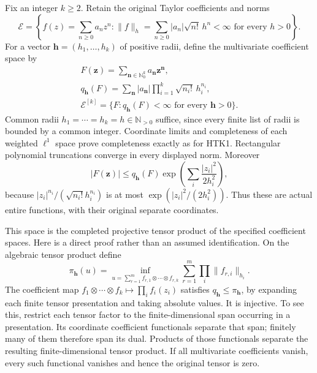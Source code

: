 Fix an integer $k\ge2$. Retain the original Taylor coefficients
and norms
\begin{equation}\tag{HTK1}
 \mathcal E=\left\{f(z)=\sum_{n\ge0}a_nz^n:
  \|f\|_h=\sum_{n\ge0}|a_n|\sqrt{n!}\,h^n<\infty
                 \text{ for every }h>0\right\}.
\end{equation}
For a vector $\mathbf h=(h_1,\ldots,h_k)$ of positive radii,
define the multivariate coefficient space by
\begin{equation}\tag{HTK2}
\begin{gathered}
 F(\mathbf z)=\sum_{\mathbf n\in\mathbb N_0^k}
                       a_{\mathbf n}\mathbf z^{\mathbf n},\\
 q_{\mathbf h}(F)=\sum_{\mathbf n}|a_{\mathbf n}|
               \prod_{i=1}^k\sqrt{n_i!}\,h_i^{n_i},\\
 \mathcal E^{[k]}=\{F:q_{\mathbf h}(F)<\infty
                                  \text{ for every }\mathbf h>0\}.
\end{gathered}
\end{equation}
Common radii $h_1=\cdots=h_k=h\in\mathbb N_{>0}$ suffice,
since every finite list of radii is bounded by a common integer.
Coordinate limits and completeness of each weighted $\ell^1$
space prove completeness exactly as for HTK1. Rectangular
polynomial truncations converge in every displayed norm.
Moreover
\[
 |F(\mathbf z)|\le q_{\mathbf h}(F)
             \exp\left(\sum_i\frac{|z_i|^2}{2h_i^2}\right),
\]
because $|z_i|^{n_i}/(\sqrt{n_i!}h_i^{n_i})$ is at most
$\exp(|z_i|^2/(2h_i^2))$. Thus these are actual entire
functions, with their original separate coordinates.

This space is the completed projective tensor product of the
specified coefficient spaces. Here is a direct proof rather
than an assumed identification. On the algebraic tensor product
define
\[
 \pi_{\mathbf h}(u)=\inf_{u=\sum_{r=1}^m
                  f_{r,1}\otimes\cdots\otimes f_{r,k}}
                   \sum_{r=1}^m\prod_i\|f_{r,i}\|_{h_i}.
\]
The coefficient map $f_1\otimes\cdots\otimes f_k\mapsto
\prod_i f_i(z_i)$ satisfies $q_{\mathbf h}\le\pi_{\mathbf h}$,
by expanding each finite tensor presentation and taking absolute
values. It is injective. To see this, restrict each tensor factor
to the finite-dimensional span occurring in a presentation.
Its coordinate coefficient functionals separate that span;
finitely many of them therefore span its dual. Products of those
functionals separate the resulting finite-dimensional tensor
product. If all multivariate coefficients vanish, every such
functional vanishes and hence the original tensor is zero.

